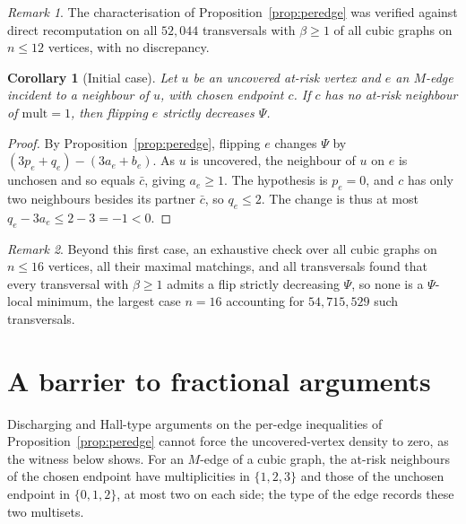 \documentclass[11pt]{article}
\newtheorem{corollary}{Corollary}
\theoremstyle{definition}
\theoremstyle{remark}
\newtheorem{remark}{Remark}
\newcommand{\Pot}{\Psi}
\begin{document}
\begin{remark}
The characterisation of Proposition~\ref{prop:peredge} was verified against direct
recomputation on all $52{,}044$ transversals with $\beta \ge 1$ of all cubic
graphs on $n \le 12$ vertices, with no discrepancy.
\end{remark}

\begin{corollary}[Initial case]\label{cor:case1}
Let $u$ be an uncovered at-risk vertex and $e$ an $M$-edge incident to a neighbour
of $u$, with chosen endpoint $c$. If $c$ has no at-risk neighbour of $\mathrm{mult}
= 1$, then flipping $e$ strictly decreases $\Pot$.
\end{corollary}

\begin{proof}
By Proposition~\ref{prop:peredge}, flipping $e$ changes $\Pot$ by
$(3p_e + q_e) - (3a_e + b_e)$. As $u$ is uncovered, the neighbour of $u$ on $e$ is
unchosen and so equals $\bar c$, giving $a_e \ge 1$. The hypothesis is $p_e = 0$,
and $c$ has only two neighbours besides its partner $\bar c$, so $q_e \le 2$. The
change is thus at most $q_e - 3a_e \le 2 - 3 = -1 < 0$.
\end{proof}

\begin{remark}
Beyond this first case, an exhaustive check over all cubic graphs on $n \le 16$
vertices, all their maximal matchings, and all transversals found that every
transversal with $\beta \ge 1$ admits a flip strictly decreasing $\Pot$, so none
is a $\Pot$-local minimum, the largest case $n = 16$ accounting
for $54{,}715{,}529$ such transversals.
\end{remark}

\section{A barrier to fractional arguments}\label{sec:barrier}

Discharging and Hall-type arguments on the per-edge inequalities of
Proposition~\ref{prop:peredge} cannot force the uncovered-vertex density to zero, as the witness below
shows. For an $M$-edge of a cubic graph,
the at-risk neighbours of the chosen endpoint have multiplicities in $\{1,2,3\}$
and those of the unchosen endpoint in $\{0,1,2\}$, at most two on each side; the
type of the edge records these two multisets.
\end{document}
